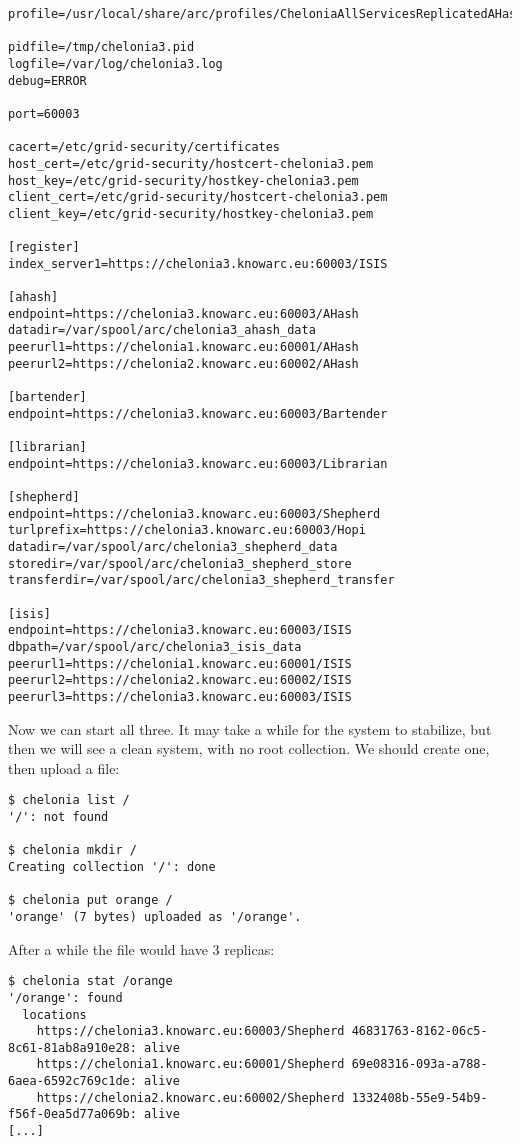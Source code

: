 \documentclass{article}
\begin{document}
\begin{verbatim}
profile=/usr/local/share/arc/profiles/CheloniaAllServicesReplicatedAHashWithISIS.xml

pidfile=/tmp/chelonia3.pid
logfile=/var/log/chelonia3.log
debug=ERROR

port=60003

cacert=/etc/grid-security/certificates
host_cert=/etc/grid-security/hostcert-chelonia3.pem
host_key=/etc/grid-security/hostkey-chelonia3.pem
client_cert=/etc/grid-security/hostcert-chelonia3.pem
client_key=/etc/grid-security/hostkey-chelonia3.pem

[register]
index_server1=https://chelonia3.knowarc.eu:60003/ISIS

[ahash]
endpoint=https://chelonia3.knowarc.eu:60003/AHash
datadir=/var/spool/arc/chelonia3_ahash_data
peerurl1=https://chelonia1.knowarc.eu:60001/AHash
peerurl2=https://chelonia2.knowarc.eu:60002/AHash

[bartender]
endpoint=https://chelonia3.knowarc.eu:60003/Bartender

[librarian]
endpoint=https://chelonia3.knowarc.eu:60003/Librarian

[shepherd]
endpoint=https://chelonia3.knowarc.eu:60003/Shepherd
turlprefix=https://chelonia3.knowarc.eu:60003/Hopi
datadir=/var/spool/arc/chelonia3_shepherd_data
storedir=/var/spool/arc/chelonia3_shepherd_store
transferdir=/var/spool/arc/chelonia3_shepherd_transfer

[isis]
endpoint=https://chelonia3.knowarc.eu:60003/ISIS
dbpath=/var/spool/arc/chelonia3_isis_data
peerurl1=https://chelonia1.knowarc.eu:60001/ISIS
peerurl2=https://chelonia2.knowarc.eu:60002/ISIS
peerurl3=https://chelonia3.knowarc.eu:60003/ISIS
\end{verbatim}

Now we can start all three. It may take a while for the system to stabilize, but then we will see a clean system, with no root collection. We should create one, then upload a file:

\begin{verbatim}
$ chelonia list /
'/': not found

$ chelonia mkdir /
Creating collection '/': done

$ chelonia put orange /
'orange' (7 bytes) uploaded as '/orange'.
\end{verbatim}

After a while the file would have 3 replicas:

\begin{verbatim}
$ chelonia stat /orange
'/orange': found
  locations
    https://chelonia3.knowarc.eu:60003/Shepherd 46831763-8162-06c5-8c61-81ab8a910e28: alive
    https://chelonia1.knowarc.eu:60001/Shepherd 69e08316-093a-a788-6aea-6592c769c1de: alive
    https://chelonia2.knowarc.eu:60002/Shepherd 1332408b-55e9-54b9-f56f-0ea5d77a069b: alive
[...]
\end{verbatim}
\end{document}
